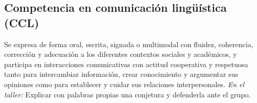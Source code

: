 \documentclass[11pt,a4paper]{article}
\begin{document}
\subsection*{Competencia en comunicación lingüística (CCL)}
\begin{description}[leftmargin=0pt, style=nextline]
  \item[\color{acento}CCL1] Se expresa de forma oral, escrita, signada o multimodal con fluidez, coherencia, corrección y adecuación a los diferentes contextos sociales y académicos, y participa en interacciones comunicativas con actitud cooperativa y respetuosa tanto para intercambiar información, crear conocimiento y argumentar sus opiniones como para establecer y cuidar sus relaciones interpersonales.\newline
    {\color{gris}\textit{En el taller:} Explicar con palabras propias una conjetura y defenderla ante el grupo.}
\end{description}
\end{document}
